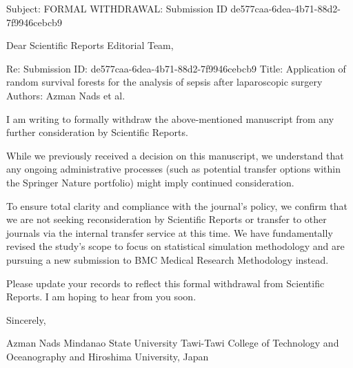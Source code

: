 Subject: FORMAL WITHDRAWAL: Submission ID de577caa-6dea-4b71-88d2-7f9946cebcb9

Dear Scientific Reports Editorial Team,

Re: Submission ID: de577caa-6dea-4b71-88d2-7f9946cebcb9
Title: Application of random survival forests for the analysis of sepsis after laparoscopic surgery
Authors: Azman Nads et al.

I am writing to formally withdraw the above-mentioned manuscript from any further consideration by Scientific Reports.

While we previously received a decision on this manuscript, we understand that any ongoing administrative processes (such as potential transfer options within the Springer Nature portfolio) might imply continued consideration.

To ensure total clarity and compliance with the journal's policy, we confirm that we are not seeking reconsideration by Scientific Reports or transfer to other journals via the internal transfer service at this time. We have fundamentally revised the study's scope to focus on statistical simulation methodology and are pursuing a new submission to BMC Medical Research Methodology instead.

Please update your records to reflect this formal withdrawal from Scientific Reports. I am hoping to hear from you soon.

Sincerely,

Azman Nads
Mindanao State University Tawi-Tawi College of Technology and Oceanography
and Hiroshima University, Japan
